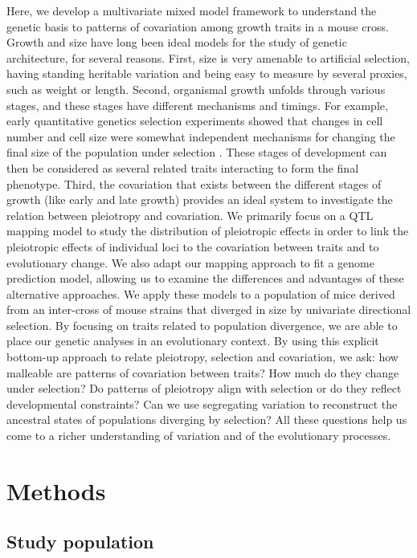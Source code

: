 \begin{refsection}
Here, we develop a multivariate mixed model framework to understand the
genetic basis to patterns of covariation among growth traits in a mouse
cross. Growth and size have long been ideal models for the study of
genetic architecture, for several reasons. First, size is very amenable
to artificial selection, having standing heritable variation and being
easy to measure by several proxies, such as weight or length. Second,
organismal growth unfolds through various stages, and these stages
have different mechanisms and timings. For example, early quantitative
genetics selection experiments showed that changes in cell number and
cell size were somewhat independent mechanisms for changing the final
size of the population under selection \parencite{Falconer1978-kq,Cheverud1983-fq,Leamy1984-df,Riska1984-ml}.
These stages of development can then be considered as several
related traits interacting to form the final phenotype. Third, the 
covariation that exists between the different stages of growth (like early and late
growth) provides an ideal system to investigate the relation between
pleiotropy and covariation. We primarily focus on a QTL mapping model to
study the distribution of pleiotropic effects in order to link the
pleiotropic effects of individual loci to the covariation between traits
and to evolutionary change. We also adapt our mapping approach to fit a
genome prediction model, allowing us to examine the differences and
advantages of these alternative approaches. We apply these models to a
population of mice derived from an inter-cross of mouse strains that
diverged in size by univariate directional selection. By focusing on
traits related to population divergence, we are able to place our
genetic analyses in an evolutionary context. By using this explicit
bottom-up approach to relate pleiotropy, selection and covariation, we
ask: how malleable are patterns of covariation between traits? How much
do they change under selection? Do patterns of pleiotropy align with
selection or do they reflect developmental constraints? Can we use
segregating variation to reconstruct the ancestral states of populations
diverging by selection? All these questions help us come to a richer
understanding of variation and of the evolutionary processes.


\section{Methods}

\subsection{Study population}


\end{refsection}
